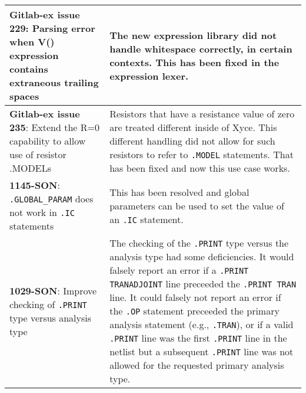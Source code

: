 {\begin{longtable}[h] {>{\raggedright\small}m{2in}|>{\raggedright\let\\\tabularnewline\small}m{3.5in}}
  \textbf{Gitlab-ex issue 229}: Parsing error when V() expression contains extraneous trailing spaces &
The new expression library did not handle whitespace correctly, in certain contexts.  
  This has been fixed in the expression lexer.
  \\ \hline

  \textbf{Gitlab-ex issue 235}: Extend the R=0 capability to allow use of resistor .MODELs & 
Resistors that have a resistance value of zero are treated different inside of Xyce.  
  This different handling did not allow for such resistors to refer to \texttt{.MODEL} statements.  
  That has been fixed and now this use case works.
  \\ \hline

  \textbf{1145-SON}: \texttt{.GLOBAL\_PARAM} does not work in \texttt{.IC} statements &  
      This has been resolved and global parameters can be used to set the 
      value of an \texttt{.IC} statement.\\ \hline

  \textbf{1029-SON}: Improve checking of \texttt{.PRINT} type versus analysis type &  
The checking of the \texttt{.PRINT} type versus the analysis type had some
deficiencies. It would falsely report an error if a \texttt{.PRINT TRANADJOINT} line
preceeded the \texttt{.PRINT TRAN} line.  It could falsely not report an error if
the \texttt{.OP} statement preceeded the primary analysis statement (e.g., 
\texttt{.TRAN}), or if a valid \texttt{.PRINT} line was the first \texttt{.PRINT}
line in the netlist but a subsequent \texttt{.PRINT} line was not allowed
for the requested primary analysis type. \\ \hline

\end{longtable}
}
